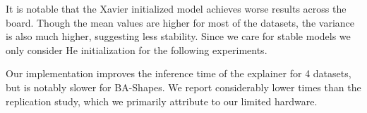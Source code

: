 It is notable that the Xavier initialized model achieves worse results across the board. Though the mean values are higher for most of the datasets, the variance is also much higher, suggesting less stability. Since we care for stable models we only consider He initialization for the following experiments. \bigskip

Our implementation improves the inference time of the explainer for 4 datasets, but is notably slower for BA-Shapes. We report considerably lower times than the replication study, which we primarily attribute to our limited hardware.








